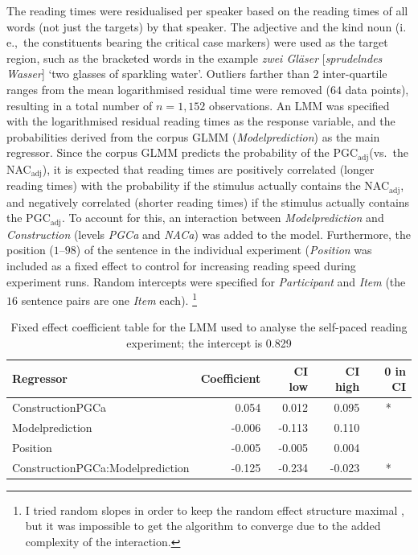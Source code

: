 \documentclass[USenglish]{article}
\newcommand{\ie}{i.\,e.,}
\newcommand{\Sub}[1]{\ensuremath{\mathrm{_{#1}}}}
\newcommand{\NACa}{NAC\Sub{adj}}
\newcommand{\PGCa}{PGC\Sub{adj}}
\begin{document}
The reading times were residualised per speaker based on the reading times of all words (not just the targets) by that speaker.
The adjective and the kind noun (\ie\ the constituents bearing the critical case markers) were used as the target region, such as the bracketed words in the example \textit{zwei Gläser} [\textit{sprudelndes Wasser}] `two glasses of sparkling water'.
Outliers farther than 2 inter-quartile ranges from the mean logarithmised residual time were removed ($64$ data points), resulting in a total number of $n=1,152$ observations.
An LMM was specified with the logarithmised residual reading times as the response variable, and the probabilities derived from the corpus GLMM (\textit{Modelprediction}) as the main regressor.
Since the corpus GLMM predicts the probability of the \PGCa (vs.\ the \NACa), it is expected that reading times are positively correlated (longer reading times) with the probability if the stimulus actually contains the \NACa, and negatively correlated (shorter reading times) if the stimulus actually contains the \PGCa.
To account for this, an interaction between \textit{Modelprediction} and \textit{Construction} (levels \textit{PGCa} and \textit{NACa}) was added to the model.
Furthermore, the position ($1$--$98$) of the sentence in the individual experiment (\textit{Position} was included as a fixed effect to control for increasing reading speed during experiment runs.
Random intercepts were specified for \textit{Participant} and \textit{Item} (the $16$ sentence pairs are one \textit{Item} each).%
\footnote{I tried random slopes in order to keep the random effect structure maximal \citep{BarrEa2013}, but it was impossible to get the algorithm to converge due to the added complexity of the interaction.}

\begin{table}
  \centering
  \begin{tabular}{lrrrc}
    Regressor & \multicolumn{1}{r}{Coefficient} & \multicolumn{1}{r}{CI low} & \multicolumn{1}{r}{CI high} & \multicolumn{1}{r}{0 in CI} \\ \midrule
    ConstructionPGCa                 &  0.054 &  0.012 &  0.095 &  *  \\ 
    Modelprediction                  & -0.006 & -0.113 &  0.110 &     \\ 
    Position                         & -0.005 & -0.005 &  0.004 &     \\ 
    ConstructionPGCa:Modelprediction & -0.125 & -0.234 & -0.023 &  *  \\ 
  \end{tabular}
  \caption{Fixed effect coefficient table for the LMM used to analyse the self-paced reading experiment; the intercept is 0.829}
  \label{tab:exp:spr}
\end{table}
\end{document}

